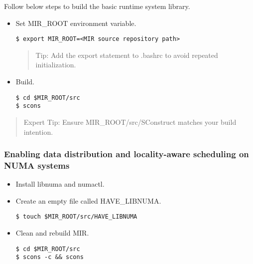 \documentclass[11pt,a4paper]{article}
\begin{document}
Follow below steps to build the basic runtime system library.

\begin{itemize}
\item Set MIR\_ROOT environment variable.

\begin{lstlisting}[style=MyInputStyle]
$ export MIR_ROOT=<MIR source repository path>
\end{lstlisting}

\begin{framed}
\begin{quote}
Tip: Add the export statement to .bashrc to avoid repeated initialization.
\end{quote}
\end{framed}

\item Build.

\begin{lstlisting}[style=MyInputStyle]
$ cd $MIR_ROOT/src
$ scons
\end{lstlisting}
\end{itemize}

\begin{framed}
\begin{quote}
Expert Tip: Ensure MIR\_ROOT/src/SConstruct matches your build intention.
\end{quote}
\end{framed}

\subsubsection{Enabling data distribution and locality-aware scheduling on NUMA systems}\label{enabling-data-distribution-and-locality-aware-scheduling-on-numa-systems}

\begin{itemize}
\item Install libnuma and numactl.
\item Create an empty file called HAVE\_LIBNUMA.

\begin{lstlisting}[style=MyInputStyle]
$ touch $MIR_ROOT/src/HAVE_LIBNUMA
\end{lstlisting}

\item Clean and rebuild MIR.

\begin{lstlisting}[style=MyInputStyle]
$ cd $MIR_ROOT/src
$ scons -c && scons
\end{lstlisting}
\end{itemize}
\end{document}
